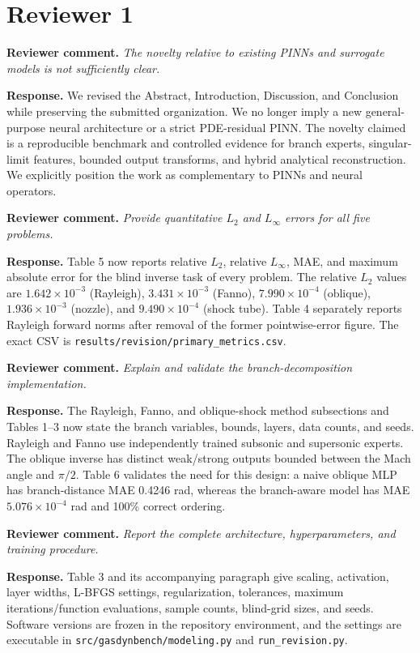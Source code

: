 \documentclass[11pt]{article}
\newcommand{\comment}[1]{\par\medskip\noindent\textbf{Reviewer comment.} \emph{#1}\par}
\newcommand{\response}[1]{\par\noindent\textcolor{responseblue}{\textbf{Response.} #1}\par\medskip}
\begin{document}
\section*{Reviewer 1}

\comment{The novelty relative to existing PINNs and surrogate models is not sufficiently clear.}
\response{We revised the Abstract, Introduction, Discussion, and Conclusion while preserving the submitted organization. We no longer imply a new general-purpose neural architecture or a strict PDE-residual PINN. The novelty claimed is a reproducible benchmark and controlled evidence for branch experts, singular-limit features, bounded output transforms, and hybrid analytical reconstruction. We explicitly position the work as complementary to PINNs and neural operators.}

\comment{Provide quantitative $L_2$ and $L_\infty$ errors for all five problems.}
\response{Table 5 now reports relative $L_2$, relative $L_\infty$, MAE, and maximum absolute error for the blind inverse task of every problem. The relative $L_2$ values are $1.642\times10^{-3}$ (Rayleigh), $3.431\times10^{-3}$ (Fanno), $7.990\times10^{-4}$ (oblique), $1.936\times10^{-3}$ (nozzle), and $9.490\times10^{-4}$ (shock tube). Table 4 separately reports Rayleigh forward norms after removal of the former pointwise-error figure. The exact CSV is \texttt{results/revision/primary\_metrics.csv}.}

\comment{Explain and validate the branch-decomposition implementation.}
\response{The Rayleigh, Fanno, and oblique-shock method subsections and Tables 1--3 now state the branch variables, bounds, layers, data counts, and seeds. Rayleigh and Fanno use independently trained subsonic and supersonic experts. The oblique inverse has distinct weak/strong outputs bounded between the Mach angle and $\pi/2$. Table 6 validates the need for this design: a naive oblique MLP has branch-distance MAE 0.4246 rad, whereas the branch-aware model has MAE $5.076\times10^{-4}$ rad and 100\% correct ordering.}

\comment{Report the complete architecture, hyperparameters, and training procedure.}
\response{Table 3 and its accompanying paragraph give scaling, activation, layer widths, L-BFGS settings, regularization, tolerances, maximum iterations/function evaluations, sample counts, blind-grid sizes, and seeds. Software versions are frozen in the repository environment, and the settings are executable in \texttt{src/gasdynbench/modeling.py} and \texttt{run\_revision.py}.}
\end{document}
